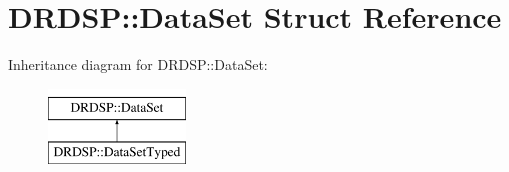 \hypertarget{struct_d_r_d_s_p_1_1_data_set}{\section{D\-R\-D\-S\-P\-:\-:Data\-Set Struct Reference}
\label{struct_d_r_d_s_p_1_1_data_set}
}
Inheritance diagram for D\-R\-D\-S\-P\-:\-:Data\-Set\-:\begin{figure}[H]
\begin{center}
\leavevmode
\includegraphics[height=2.000000cm]{struct_d_r_d_s_p_1_1_data_set}
\end{center}
\end{figure}
